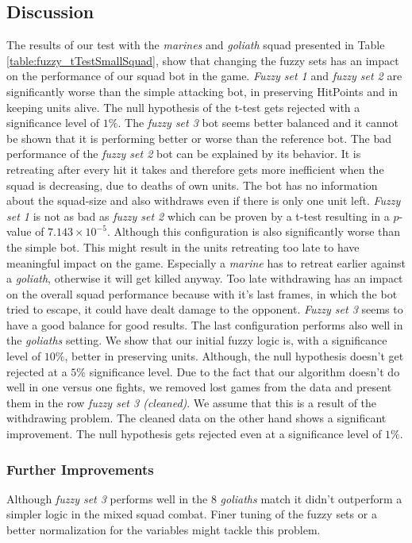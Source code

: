 %
\subsection{Discussion}
The results of our test with the {\it marines} and {\it goliath} squad presented in Table \ref{table:fuzzy_tTestSmallSquad}, show that changing the fuzzy sets has an impact on the performance of our squad bot in the game. \emph{Fuzzy set 1} and \emph{ fuzzy set 2} are significantly worse than the simple attacking bot, in preserving HitPoints and in keeping units alive. The null hypothesis of the t-test gets rejected with a significance level of $1\%$.
The \emph{fuzzy set 3} bot seems better balanced and it cannot be shown that it is performing better or worse than the reference bot.
The bad performance of the \emph{ fuzzy set 2} bot can be explained by its behavior. It is retreating after every hit it takes and therefore gets more inefficient when the squad is decreasing, due to deaths of own units. The bot has no information about the squad-size and also withdraws even if there is only one unit left.
\emph{ Fuzzy set 1} is not as bad as \emph{ fuzzy set 2} which can be proven by a t-test resulting in a $p$-value of $7.143\times10^{-5}$. Although this configuration is also significantly worse than the simple bot. This might result in the units retreating too late to have meaningful impact on the game. Especially a {\it marine} has to retreat earlier against a {\it goliath}, otherwise it will get killed anyway. Too late withdrawing has an impact on the overall squad performance because with it's last frames, in which the bot tried to escape, it could have dealt damage to the opponent.
\emph{Fuzzy set 3} seems to have a good balance for good results.
The last configuration performs also well in the {\it goliaths} setting.  We show that our initial fuzzy logic is, with a significance level of $10\%$, better in preserving units. Although, the null hypothesis doesn't get rejected at a $5\%$ significance level.
Due to the fact that our algorithm doesn't do well in one versus one fights, we removed lost games from the data and present them in the row {\it fuzzy set 3 (cleaned)}. We assume that this is a result of the withdrawing problem. The cleaned data on the other hand shows a significant improvement. The null hypothesis gets rejected even at a significance level of $1\%$.
%
\subsubsection{Further Improvements} %
Although \emph{fuzzy set 3} performs well in the 8 {\it goliaths} match it didn't outperform a simpler logic in the mixed squad combat. Finer tuning of the fuzzy sets or a better normalization for the variables might tackle this problem.

